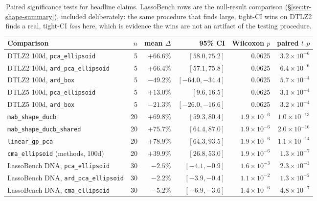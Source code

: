 \documentclass[11pt]{article}
\begin{document}
\begin{table}[h]
\centering
\caption{Paired significance tests for headline claims. LassoBench rows
are the null-result comparison (\S\ref{sec:tr-shape-summary}), included
deliberately: the same procedure that finds large, tight-CI wins on DTLZ2
finds a real, tight-CI \emph{loss} here, which is evidence the wins are
not an artifact of the testing procedure.}
\label{tab:significance}
\begin{tabular}{lrrrrr}
\toprule
Comparison & $n$ & mean $\Delta$ & 95\% CI & Wilcoxon $p$ & paired $t$ $p$ \\
\midrule
DTLZ2 100d, \texttt{pca\_ellipsoid} & 5 & $+66.6\%$ & $[58.0, 75.2]$ & 0.0625 & $3.2{\times}10^{-6}$ \\
DTLZ2 100d, \texttt{ard\_pca\_ellipsoid} & 5 & $+66.4\%$ & $[57.1, 75.8]$ & 0.0625 & $6.4{\times}10^{-6}$ \\
DTLZ2 100d, \texttt{ard\_box} & 5 & $-49.2\%$ & $[-64.0, -34.4]$ & 0.0625 & $5.7{\times}10^{-4}$ \\
DTLZ5 100d, \texttt{pca\_ellipsoid} & 5 & $+13.0\%$ & $[9.6, 16.5]$ & 0.0625 & $3.1{\times}10^{-4}$ \\
DTLZ5 100d, \texttt{ard\_box} & 5 & $-21.3\%$ & $[-26.0, -16.6]$ & 0.0625 & $3.2{\times}10^{-4}$ \\
\texttt{mab\_shape\_ducb} & 20 & $+69.8\%$ & $[59.3, 80.4]$ & $1.9{\times}10^{-6}$ & $1.0{\times}10^{-13}$ \\
\texttt{mab\_shape\_ducb\_shared} & 20 & $+75.7\%$ & $[64.4, 87.0]$ & $1.9{\times}10^{-6}$ & $2.0{\times}10^{-16}$ \\
\texttt{linear\_gp\_pca} & 20 & $+78.9\%$ & $[64.3, 93.5]$ & $1.9{\times}10^{-6}$ & $1.1{\times}10^{-14}$ \\
\texttt{cma\_ellipsoid} (methods, 100d) & 20 & $+39.9\%$ & $[26.8, 53.0]$ & $1.9{\times}10^{-6}$ & $1.3{\times}10^{-7}$ \\
LassoBench DNA, \texttt{pca\_ellipsoid} & 30 & $-2.5\%$ & $[-4.1, -0.9]$ & $1.6{\times}10^{-3}$ & $2.3{\times}10^{-3}$ \\
LassoBench DNA, \texttt{ard\_pca\_ellipsoid} & 30 & $-2.2\%$ & $[-3.9, -0.4]$ & $1.1{\times}10^{-2}$ & $1.3{\times}10^{-2}$ \\
LassoBench DNA, \texttt{cma\_ellipsoid} & 30 & $-5.2\%$ & $[-6.9, -3.6]$ & $1.4{\times}10^{-6}$ & $4.8{\times}10^{-7}$ \\
\bottomrule
\end{tabular}
\end{table}
\end{document}
